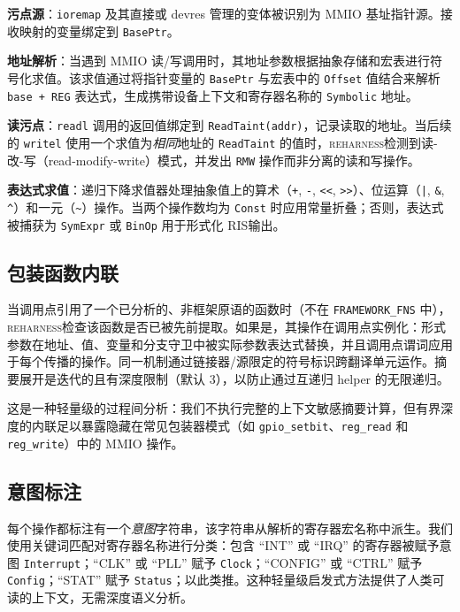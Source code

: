 \documentclass[sigplan, screen, review, anonymous]{acmart}
\newcommand{\reharness}{\textsc{reharness}}
\newcommand{\rislang}{RIS}
\begin{document}
\textbf{污点源}：\texttt{ioremap} 及其直接或 devres 管理的变体被识别为 MMIO 基址指针源。接收映射的变量绑定到 \texttt{BasePtr}。

\textbf{地址解析}：当遇到 MMIO 读/写调用时，其地址参数根据抽象存储和宏表进行符号化求值。该求值通过将指针变量的 \texttt{BasePtr} 与宏表中的 \texttt{Offset} 值结合来解析 \texttt{base + REG} 表达式，生成携带设备上下文和寄存器名称的 \texttt{Symbolic} 地址。

\textbf{读污点}：\texttt{readl} 调用的返回值绑定到 \texttt{ReadTaint(addr)}，记录读取的地址。当后续的 \texttt{writel} 使用一个求值为\textit{相同}地址的 \texttt{ReadTaint} 的值时，\reharness 检测到读-改-写（read-modify-write）模式，并发出 \texttt{RMW} 操作而非分离的读和写操作。

\textbf{表达式求值}：递归下降求值器处理抽象值上的算术（\texttt{+}, \texttt{-}, \texttt{<<}, \texttt{>>}）、位运算（\texttt{|}, \texttt{\&}, \texttt{\^{}}）和一元（\texttt{\~{}}）操作。当两个操作数均为 \texttt{Const} 时应用常量折叠；否则，表达式被捕获为 \texttt{SymExpr} 或 \texttt{BinOp} 用于形式化 \rislang 输出。

\subsection{包装函数内联}

当调用点引用了一个已分析的、非框架原语的函数时（不在 \texttt{FRAMEWORK\_FNS} 中），\reharness 检查该函数是否已被先前提取。如果是，其操作在调用点实例化：形式参数在地址、值、变量和分支守卫中被实际参数表达式替换，并且调用点谓词应用于每个传播的操作。同一机制通过链接器/源限定的符号标识跨翻译单元运作。摘要展开是迭代的且有深度限制（默认 3），以防止通过互递归 helper 的无限递归。

这是一种轻量级的过程间分析：我们不执行完整的上下文敏感摘要计算，但有界深度的内联足以暴露隐藏在常见包装器模式（如 \texttt{gpio\_setbit}、\texttt{reg\_read} 和 \texttt{reg\_write}）中的 MMIO 操作。

\subsection{意图标注}

每个操作都标注有一个\emph{意图}字符串，该字符串从解析的寄存器宏名称中派生。我们使用关键词匹配对寄存器名称进行分类：包含 ``INT'' 或 ``IRQ'' 的寄存器被赋予意图 \texttt{Interrupt}；``CLK'' 或 ``PLL'' 赋予 \texttt{Clock}；``CONFIG'' 或 ``CTRL'' 赋予 \texttt{Config}；``STAT'' 赋予 \texttt{Status}；以此类推。这种轻量级启发式方法提供了人类可读的上下文，无需深度语义分析。
\end{document}
